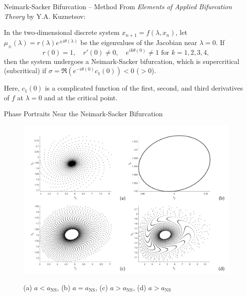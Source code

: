 \documentclass[]{beamer}
\begin{document}
	\begin{frame}{Neimark-Sacker Bifurcation -- Method}
		From \textit{Elements of Applied Bifurcation Theory} by Y.A. Kuznetsov:
		\vfill
		\begin{block}{}
			In the two-dimensional discrete system $x_{n+1} = f(\lambda, x_n)$, let $\mu_{\pm}(\lambda) = r(\lambda)e^{\pm i\theta(\lambda)}$ be the eigenvalues of the Jacobian near $\lambda = 0$. If
			\begin{equation*}
				r(0) = 1, \quad r'(0) \ne 0, \quad e^{ik\theta(0)} \ne 1 \text{ for } k =1,2,3,4,
			\end{equation*}
			then the system undergoes a Neimark-Sacker bifurcation, which is supercritical (subcritical) if $\sigma = \Re\left(e^{-i\theta(0)}c_1(0)\right) < 0$ ($>0$).
		\end{block}
		\vfill
		
		Here, $c_1(0)$ is a complicated function of the first, second, and third derivatives of $f$ at $\lambda = 0$ and at the critical point.
	\end{frame}
	
	\begin{frame}{Phase Portraits Near the Neimark-Sacker Bifurcation}
		\begin{figure}
			\centering
			\includegraphics[width=\textwidth]{ns.png}
			
			(a) $a < a_{\text{NS}}$, (b) $a = a_{\text{NS}}$, (c) $a > a_{\text{NS}}$, (d) $a > a_{\text{NS}}$
		\end{figure}
	\end{frame}
	
	\iftoggle{handout}{}{
	\begin{frame}{}
		\centering
		Thank You!
	\end{frame}
	}
\end{document}
